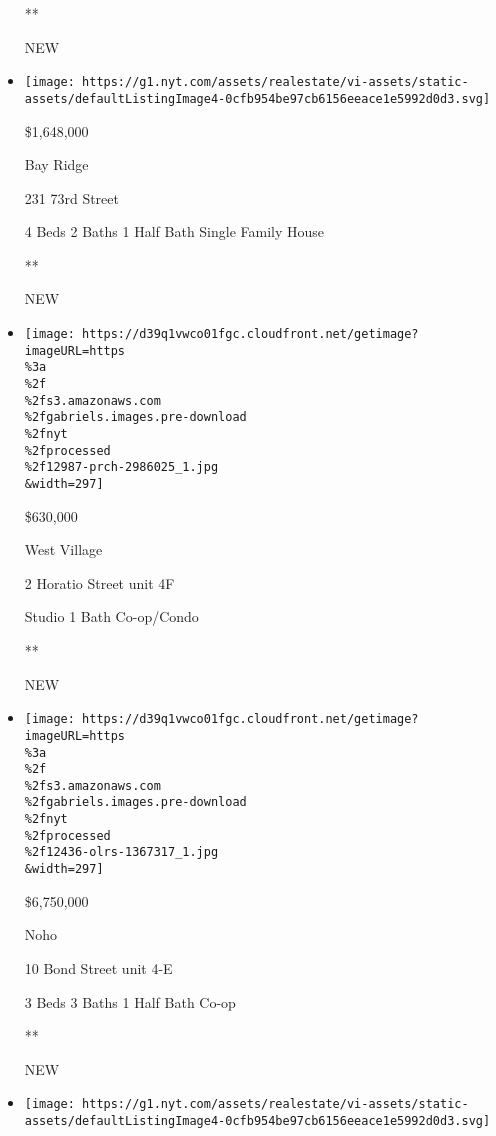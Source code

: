 \begin{itemize}
  **

  NEW
\item
  \href{/real-estate/usa/ny/brooklyn/bay-ridge/homes-for-sale/231-73rd-street/4446-5535161?}{}

  \texttt{[image: https://g1.nyt.com/assets/realestate/vi-assets/static-assets/defaultListingImage4-0cfb954be97cb6156eeace1e5992d0d3.svg]}

  \$1,648,000

  Bay Ridge

  231 73rd Street

  4 Beds \textbar{} 2 Baths \textbar{} 1 Half Bath \textbar{} Single
  Family House

  **

  NEW
\item
  \href{/real-estate/usa/ny/new-york/west-village/homes-for-sale/2-horatio-street/12987-PRCH-2986025?}{}

  \texttt{[image: https://d39q1vwco01fgc.cloudfront.net/getimage?imageURL=https\\\%3a\\\%2f\\\%2fs3.amazonaws.com\\\%2fgabriels.images.pre-download\\\%2fnyt\\\%2fprocessed\\\%2f12987-prch-2986025\_1.jpg\\\&width=297]}

  \$630,000

  West Village

  2 Horatio Street unit 4F

  Studio \textbar{} 1 Bath \textbar{} Co-op/Condo

  **

  NEW
\item
  \href{/real-estate/usa/ny/new-york/noho/homes-for-sale/10-bond-street/12436-OLRS-1367317?}{}

  \texttt{[image: https://d39q1vwco01fgc.cloudfront.net/getimage?imageURL=https\\\%3a\\\%2f\\\%2fs3.amazonaws.com\\\%2fgabriels.images.pre-download\\\%2fnyt\\\%2fprocessed\\\%2f12436-olrs-1367317\_1.jpg\\\&width=297]}

  \$6,750,000

  Noho

  10 Bond Street unit 4-E

  3 Beds \textbar{} 3 Baths \textbar{} 1 Half Bath \textbar{} Co-op

  **

  NEW
\item
  \href{/real-estate/usa/ny/brooklyn/bensonhurst/homes-for-sale/1917-72nd-street/14932-5535460?}{}

  \texttt{[image: https://g1.nyt.com/assets/realestate/vi-assets/static-assets/defaultListingImage4-0cfb954be97cb6156eeace1e5992d0d3.svg]}


\end{itemize}
